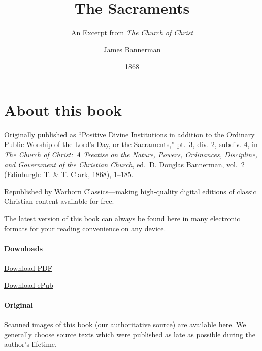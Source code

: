 \documentclass[
]{book}
\title{The Sacraments}
\subtitle{An Excerpt from \emph{The Church of Christ}}
\author{James Bannerman}
\date{1868}
\begin{document}
\maketitle



{
\hypersetup{linkcolor=}
\setcounter{tocdepth}{1}
\tableofcontents
}
\hypertarget{about-this-book}{%
\chapter*{About this book}\label{about-this-book}}


Originally published as ``Positive Divine Institutions in addition to the Ordinary Public Worship of the Lord's Day, or the Sacraments,'' pt.~3, div. 2, subdiv. 4, in \emph{The Church of Christ: A Treatise on the Nature, Powers, Ordinances, Discipline, and Government of the Christian Church}, ed.~D. Douglas Bannerman, vol.~2 (Edinburgh: T. \& T. Clark, 1868), 1--185.

Republished by \href{https://classics.warhornmedia.com/}{Warhorn Classics}---making high-quality digital editions of classic Christian content available for free.

The latest version of this book can always be found \href{https://warhornmedia.github.io/bannerman-sacraments/}{here} in many electronic formats for your reading convenience on any device.

\hypertarget{downloads}{%
\subsubsection*{Downloads}\label{downloads}}

\href{https://warhornmedia.github.io/bannerman-sacraments//Bannerman-Sacraments.pdf}{Download PDF}

\href{https://warhornmedia.github.io/bannerman-sacraments//Bannerman-Sacraments.epub}{Download ePub}

\hypertarget{original}{%
\subsubsection*{Original}\label{original}}

Scanned images of this book (our authoritative source) are available \href{https://archive.org/details/churchofchristtr02bann/page/n11/mode/2up}{here}. We generally choose source texts which were published as late as possible during the author's lifetime.
\end{document}
